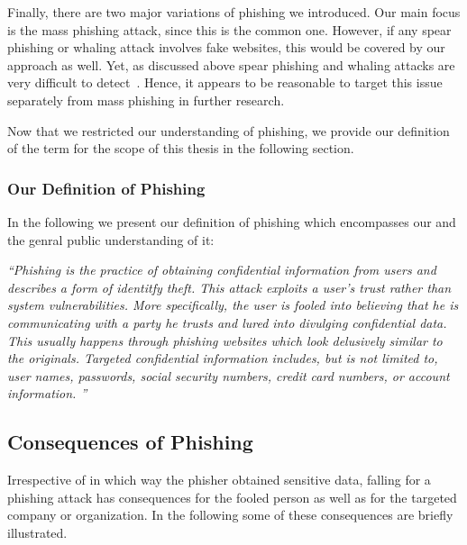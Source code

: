   Finally, there are two major variations of phishing we introduced.
 Our main focus is the mass phishing attack, since this is the common one.
 However, if any spear phishing or whaling attack involves fake websites, this would be covered by our approach as well.
Yet, as discussed above spear phishing and whaling attacks are very difficult to detect~\cite{trendlabs2012spear,statephishinghong}.
Hence, it appears to be reasonable to target this issue separately from mass phishing in further research.

Now that we restricted our understanding of phishing, we provide our definition of the term for the scope of this thesis in the following section.

\subsubsection{Our Definition of Phishing}
In the following we present our definition of phishing which encompasses our and the genral public understanding of it:

\begin{center}
\textit{``Phishing is the practice of obtaining confidential information from users and describes a form of identitfy theft. This attack exploits a user's trust rather than system vulnerabilities. More specifically, the user is fooled into believing that he is communicating with a party he trusts and lured into divulging confidential data. This usually happens through phishing websites which look delusively similar to the originals. Targeted confidential information includes, but is not limited to, user names, passwords, social security numbers, credit card numbers, or account information.
''}~\cite{jakobsson2006phishing}
\end{center}

\subsection{Consequences of Phishing}
Irrespective of in which way the phisher obtained sensitive data, falling for a phishing attack has consequences for the fooled person as well as for the targeted company or organization.
In the following some of these consequences are briefly illustrated.

